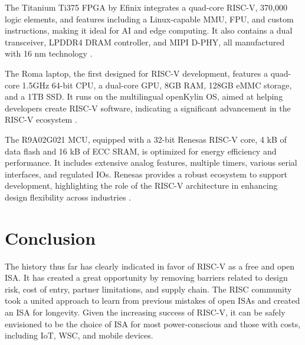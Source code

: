 \documentclass[journal]{IEEEtran}
\begin{document}
The Titanium Ti375 FPGA by Efinix integrates a quad-core RISC-V, 370,000 logic elements, and features including a Linux-capable MMU, FPU, and custom instructions, making it ideal for AI and edge computing. It also contains a dual transceiver, LPDDR4 DRAM controller, and MIPI D-PHY, all manufactured with 16 nm technology \cite{nordyk_fpga_2024}.

The Roma laptop, the first designed for RISC-V development, features a quad-core 1.5GHz 64-bit CPU, a dual-core GPU, 8GB RAM, 128GB eMMC storage, and a 1TB SSD. It runs on the multilingual openKylin OS, aimed at helping developers create RISC-V software, indicating a significant advancement in the RISC-V ecosystem \cite{anisha_worlds_nodate}.

The R9A02G021 MCU, equipped with a 32-bit Renesas RISC-V core, 4 kB of data flash and 16 kB of ECC SRAM, is optimized for energy efficiency and performance. It includes extensive analog features, multiple timers, various serial interfaces, and regulated IOs. Renesas provides a robust ecosystem to support development, highlighting the role of the RISC-V architecture in enhancing design flexibility across industries \cite{noauthor_ultra-low_nodate}.

\section{Conclusion}
The history thus far has clearly indicated in favor of RISC-V as a free and open ISA. It has created a great opportunity by removing barriers related to design risk, cost of entry, partner limitations, and supply chain. The RISC community took a united approach to learn from previous mistakes of open ISAs and created an ISA for longevity. Given the increasing success of RISC-V, it can be safely envisioned to be the choice of ISA for most power-conscious and those with costs, including IoT, WSC, and mobile devices.  












\end{document}
